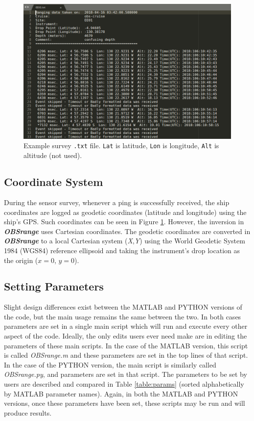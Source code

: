 \documentclass[titlepage, 12pt]{article}
\begin{document}
  \begin{figure}[!htb]
   \includegraphics[width=\linewidth]{survey_fle_ex.png}
   \caption{Example survey \texttt{.txt} file. \texttt{Lat} is latitude, \texttt{Lon} is longitude, \texttt{Alt} is altitude (not used). }
   \label{fig:surveyfle}
  \end{figure} 
  
  \subsection{Coordinate System}
During the sensor survey, whenever a ping is successfully received, the ship coordinates are logged as geodetic coordinates (latitude and longitude) using the ship's GPS. Such coordinates can be seen in Figure \ref{fig:surveyfle}. However, the inversion in \textit{\textbf{OBSrange}} uses Cartesian coordinates. The geodetic coordinates are converted in \textit{\textbf{OBSrange}} to a local Cartesian system (\textit{X},\textit{Y}) using the World Geodetic System 1984 (WGS84) reference ellipsoid and taking the instrument's drop location as the origin ($x=0$, $y=0$).  
  \subsection{Setting Parameters}
  \label{section:params}
  Slight design differences exist between the MATLAB and PYTHON versions of the code, but the main usage remains the same between the two. In both cases parameters are set in a single main script which will run and execute every other aspect of the code. Ideally, the only edits users ever need make are in editing the parameters of these main scripts. In the case of the MATLAB version, this script is called \textit{OBSrange.m} and these parameters are set in the top lines of that script. In the case of the PYTHON version, the main script is similarly called \textit{OBSrange.py}, and parameters are set in that script. The parameters to be set by users are described and compared in Table \ref{table:params} (sorted alphabetically by MATLAB parameter names).  Again, in both the MATLAB and PYTHON versions, once these parameters have been set, these scripts may be run and will produce results. 
\end{document}
